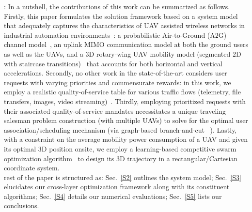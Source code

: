 \documentclass[10pt, twocolumn]{IEEEtran}
\begin{document}
: In a nutshell, the contributions of this work can be summarized as follows. Firstly, this paper formulates the solution framework based on a system model that adequately captures the characteristics of UAV assisted wireless networks in industrial automation environments~\cite{Motivation_1, Motivation_2}: a probabilistic Air-to-Ground (A$2$G) channel model~\cite{MAESTRO_TCCN}, an uplink MIMO communication model at both the ground users as well as the UAVs, and a $3$D rotary-wing UAV mobility model (segmented $2$D with staircase transitions)~\cite{UAV_Propulsion_1} that accounts for both horizontal and vertical accelerations. Secondly, no other work in the state-of-the-art considers user requests with varying priorities and commensurate rewards: in this work, we employ a realistic quality-of-service table for various traffic flows (telemetry, file transfers, images, video streaming)~\cite{DARPA:SC2}. Thirdly, employing prioritized requests with their associated quality-of-service mandates necessitates a unique traveling salesman problem construction (with multiple UAVs) to solve for the optimal user association/scheduling mechanism (via graph-based branch-and-cut ~\cite{mTSP}). Lastly, with a constraint on the average mobility power consumption of a UAV and given its optimal $3$D position onsite, we employ a learning-based competitive swarm optimization algorithm~\cite{LCSO} to design its $3$D trajectory in a rectangular/Cartesian coordinate system.\\
 rest of the paper is structured as: Sec.~\ref{S2} outlines the system model; Sec.~\ref{S3} elucidates our cross-layer optimization framework along with its constituent algorithms; Sec.~\ref{S4} details our numerical evaluations; Sec.~\ref{S5} lists our conclusions.
\vspace{-6mm}
\end{document}
